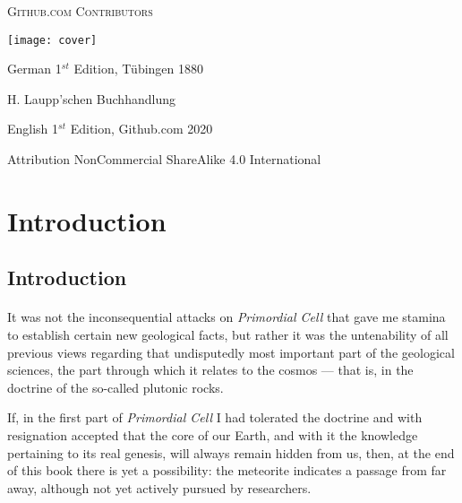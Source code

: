 \documentclass[a4paper, 12pt, oneside]{article}
\begin{document}
\begin{titlepage}
	{\scshape Github.com Contributors \\ } %
			
	\vspace{1\baselineskip} %
	
	
	\texttt{[image: cover]}
	
		
	\vspace{1\baselineskip} %
	
	German 1$^{st}$ Edition, Tübingen 1880 %
	
	{\small H. Laupp'schen Buchhandlung } %

	\vspace{1\baselineskip} %

    English 1$^{st}$ Edition, Github.com 2020 %
	
	{\small Attribution NonCommercial ShareAlike 4.0 International } %
\end{titlepage}
\setlength{\parskip}{1mm plus1mm minus1mm}
\setcounter{tocdepth}{2}
\setcounter{secnumdepth}{3}
\tableofcontents
\clearpage
\listoffigures
\clearpage
\section{Introduction}
\subsection{Introduction}
\paragraph{}
It was not the inconsequential attacks on \emph{Primordial Cell} that gave me stamina to establish certain new geological facts, but rather it was the untenability of all previous views regarding that undisputedly most important part of the geological sciences, the part through which it relates to the cosmos --- that is, in the doctrine of the so-called plutonic rocks.

If, in the first part of \emph{Primordial Cell} I had tolerated the doctrine and with resignation accepted that the core of our Earth, and with it the knowledge pertaining to its real genesis, will always remain hidden from us, then, at the end of this book there is yet a possibility: the meteorite indicates a passage from far away, although not yet actively pursued by researchers.
\end{document}

